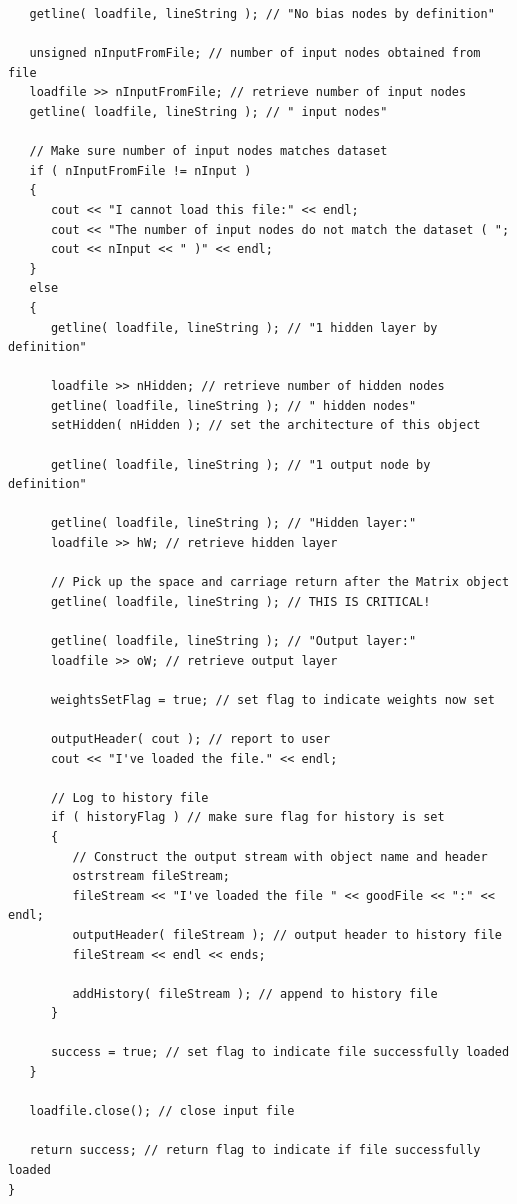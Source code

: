 \documentclass{report}[10pt]
\begin{document}
\begin{verbatim}
   getline( loadfile, lineString ); // "No bias nodes by definition"
   
   unsigned nInputFromFile; // number of input nodes obtained from file
   loadfile >> nInputFromFile; // retrieve number of input nodes
   getline( loadfile, lineString ); // " input nodes"

   // Make sure number of input nodes matches dataset
   if ( nInputFromFile != nInput )
   {
      cout << "I cannot load this file:" << endl;
      cout << "The number of input nodes do not match the dataset ( ";
      cout << nInput << " )" << endl;
   }
   else
   {
      getline( loadfile, lineString ); // "1 hidden layer by definition"

      loadfile >> nHidden; // retrieve number of hidden nodes
      getline( loadfile, lineString ); // " hidden nodes"
      setHidden( nHidden ); // set the architecture of this object

      getline( loadfile, lineString ); // "1 output node by definition"

      getline( loadfile, lineString ); // "Hidden layer:"
      loadfile >> hW; // retrieve hidden layer

      // Pick up the space and carriage return after the Matrix object
      getline( loadfile, lineString ); // THIS IS CRITICAL!

      getline( loadfile, lineString ); // "Output layer:"
      loadfile >> oW; // retrieve output layer

      weightsSetFlag = true; // set flag to indicate weights now set

      outputHeader( cout ); // report to user
      cout << "I've loaded the file." << endl;

      // Log to history file
      if ( historyFlag ) // make sure flag for history is set
      {
         // Construct the output stream with object name and header
         ostrstream fileStream;
         fileStream << "I've loaded the file " << goodFile << ":" << endl;
         outputHeader( fileStream ); // output header to history file
         fileStream << endl << ends;
         
         addHistory( fileStream ); // append to history file
      }

      success = true; // set flag to indicate file successfully loaded
   }

   loadfile.close(); // close input file

   return success; // return flag to indicate if file successfully loaded
}


\end{verbatim}
\end{document}
